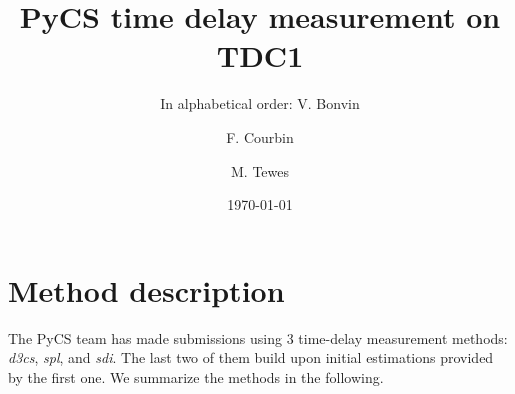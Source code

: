 \documentclass[traditabstract]{aa}
\begin{document}
\title{PyCS time delay measurement on TDC1}
\author{ In alphabetical order:
V. Bonvin\inst{\ref{epfl}} \and
F. Courbin\inst{\ref{epfl}} \and
M. Tewes\inst{\ref{bonn}}
}


\date{\today}

\maketitle



\section{Method description}

The PyCS team has made submissions using 3 time-delay measurement methods: \emph{d3cs}, \emph{spl}, and \emph{sdi}. The last two of them build upon initial estimations provided by the first one. We summarize the methods in the following. 
\end{document}

